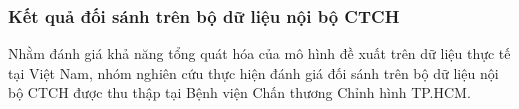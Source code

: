 \subsubsection{Kết quả đối sánh trên bộ dữ liệu nội bộ CTCH}
Nhằm đánh giá khả năng tổng quát hóa của mô hình đề xuất trên dữ liệu thực tế tại Việt Nam, nhóm nghiên cứu thực hiện đánh giá đối sánh trên bộ dữ liệu nội bộ CTCH được thu thập tại Bệnh viện Chấn thương Chỉnh hình TP.HCM.



